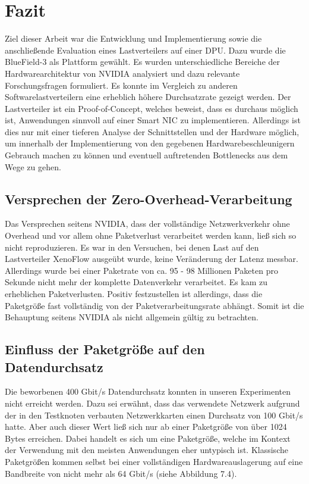 \chapter{Fazit}
Ziel dieser Arbeit war die Entwicklung und Implementierung sowie die anschließende Evaluation eines Lastverteilers auf einer DPU. Dazu wurde die BlueField-3 als Plattform gewählt. Es wurden unterschiedliche Bereiche der Hardwarearchitektur von NVIDIA analysiert und dazu relevante Forschungsfragen formuliert. Es konnte im Vergleich zu anderen Softwarelastverteilern eine erheblich höhere Durchsatzrate gezeigt werden. Der Lastverteiler ist ein Proof-of-Concept, welches beweist, dass es durchaus möglich ist, Anwendungen sinnvoll auf einer Smart NIC zu implementieren. Allerdings ist dies nur mit einer tieferen Analyse der Schnittstellen und der Hardware möglich, um innerhalb der Implementierung von den gegebenen Hardwarebeschleunigern Gebrauch machen zu können und eventuell auftretenden Bottlenecks aus dem Wege zu gehen.
\section{Versprechen der Zero-Overhead-Verarbeitung}
Das Versprechen seitens NVIDIA, dass der vollständige Netzwerkverkehr ohne Overhead und vor allem ohne Paketverlust verarbeitet werden kann, ließ sich so nicht reproduzieren. Es war in den Versuchen, bei denen Last auf den Lastverteiler XenoFlow ausgeübt wurde, keine Veränderung der Latenz messbar. Allerdings wurde bei einer Paketrate von ca. 95 - 98 Millionen Paketen pro Sekunde nicht mehr der komplette Datenverkehr verarbeitet. Es kam zu erheblichen Paketverlusten. Positiv festzustellen ist allerdings, dass die Paketgröße fast vollständig von der Paketverarbeitungsrate abhängt. Somit ist die Behauptung seitens NVIDIA als nicht allgemein gültig zu betrachten.
\section{Einfluss der Paketgröße auf den Datendurchsatz}
Die beworbenen 400 Gbit/s Datendurchsatz konnten in unseren Experimenten nicht erreicht werden. Dazu sei erwähnt, dass das verwendete Netzwerk aufgrund der in den Testknoten verbauten Netzwerkkarten einen Durchsatz von 100 Gbit/s hatte. Aber auch dieser Wert ließ sich nur ab einer Paketgröße von über 1024 Bytes erreichen. Dabei handelt es sich um eine Paketgröße, welche im Kontext der Verwendung mit den meisten Anwendungen eher untypisch ist. Klassische Paketgrößen kommen selbst bei einer vollständigen Hardwareauslagerung auf eine Bandbreite von nicht mehr als 64 Gbit/s (siehe Abbildung 7.4).
